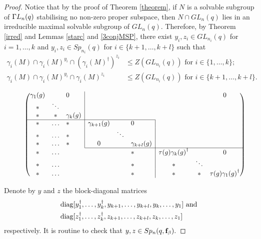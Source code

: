 \begin{proof}
 Notice that by the proof of Theorem \ref{theorem}, if $N$ is a solvable subgroup of ${{\Gamma L}}_n(q)$  stabilising no  non-zero proper subspace, then $N \cap GL_n(q)$ lies in an irreducible maximal  solvable subgroup of $GL_n(q).$ Therefore, by  Theorem  \ref{irred} and Lemmas \ref{starc} and \ref{3conjMSP},  there exist $y_i, z_i \in GL_{n_i}(q)$ for $i=1, \ldots, k$ and $y_i, z_i \in Sp_{n_i}(q)$ for $i \in \{k+1, \ldots, k+l\}$ such that 
\begin{equation}\label{smintSp}
\begin{split}
\gamma_i(M) \cap \gamma_i(M)^{y_i} \cap (\gamma_i(M)^{\dagger})^{z_i} & \le Z(GL_{n_i}(q)) \text{ for } i \in\{1, \ldots, k\};\\
\gamma_i(M) \cap \gamma_i(M)^{y_i} \cap \gamma_i(M)^{z_i} & \le Z(GL_{n_i}(q)) \text{ for } i \in \{k+1, \ldots, k+l \} .
\end{split}
\end{equation}
\begin{figure}[t]
\begin{equation}\label{antigstSp}
\Scale[0.95]{\begin{pmatrix}
\gamma_{1}(g)& &\multicolumn{1}{l|}{0} & &  & & &    &0  \\
    *    & \ddots &\multicolumn{1}{l|}{} & & & & &    &\\
*        &* & \multicolumn{1}{l|}{\gamma_{k}(g)}& & & & &    & \\  \cline{1-6}
 *       &\ldots & \multicolumn{1}{l|}{*} &\gamma_{k+1}(g) & & \multicolumn{1}{l|}{0}  & &    &\\ 
  *      &\ldots &  \multicolumn{1}{l|}{*}& &\ddots &\multicolumn{1}{l|}{}       & &   &\\
   *     &\ldots &  \multicolumn{1}{l|}{*}&0 & &\multicolumn{1}{l|}{\gamma_{k+l}(g)}    &  &    & \\ \cline{4-9} 
    *    &\ldots & & & &\multicolumn{1}{l|}{*} & {{\tau(g) \gamma_{k}(g)}^{\dagger}}  &    &0 \\
    *    &\ldots & & & &\multicolumn{1}{l|}{*} &* & \ddots   &\\
*        &\ldots & & & &\multicolumn{1}{l|}{*} &* & *   & {{\tau(g) \gamma_{1}(g)}^{\dagger}} \\  
\end{pmatrix}}
\end{equation}
\end{figure}
 Denote by $y$ and $z$ the block-diagonal matrices 
\begin{equation}\label{yizi}
\begin{split}
&\mathrm{diag}[y_1^{\dagger}, \ldots, y_k^{\dagger}, y_{k+1}, \ldots, y_{k+l}, y_k, \ldots, y_1]  \text{ and }\\
&\mathrm{diag}[z_1^{\dagger}, \ldots, z_k^{\dagger}, z_{k+1}, \ldots, z_{k+l}, z_k, \ldots, z_1]
\end{split}
\end{equation}
 respectively. It is routine to check that $y,z \in Sp_n(q,{\bf f}_{\beta}).$


\end{proof}
